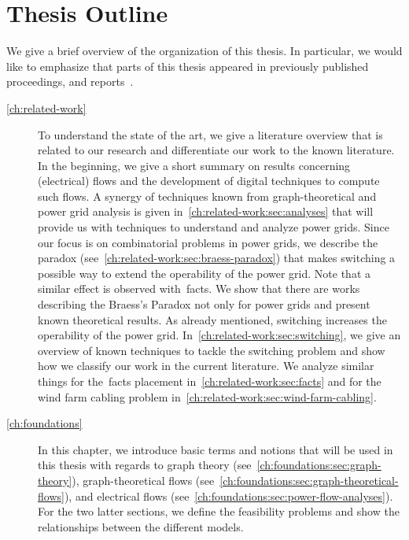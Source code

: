 \section{Thesis Outline}
\label{ch:intro:sec:outline}
% 
We give a brief overview of the organization of this thesis. In particular, we
would like to emphasize that parts of this thesis appeared in previously
published proceedings, and reports~\parencite{Lei15b,Lei15,Mch15,Leh17,Gra18}.
% 
\begin{description}
    \item[\cref{ch:related-work}] To understand the state of the art, we give a
    literature overview that is related to our research and differentiate our
    work to the known literature. In the beginning, we give a short summary on
    results concerning (electrical) flows and the development of digital
    techniques to compute such flows. A synergy of techniques known from
    graph-theoretical and power grid analysis is given
    in~\cref{ch:related-work:sec:analyses} that will provide us with techniques
    to understand and analyze power grids. Since our focus is on combinatorial
    problems in power grids, we describe the paradox
    (see~\cref{ch:related-work:sec:braess-paradox}) that makes switching a
    possible way to extend the operability of the power grid. Note that a
    similar effect is observed with~\gls{facts}. We show that there are works
    describing the Braess's Paradox not only for power grids and present known
    theoretical results. As already mentioned, switching increases the
    operability of the power grid. In~\cref{ch:related-work:sec:switching}, we
    give an overview of known techniques to tackle the switching problem and
    show how we classify our work in the current literature. We analyze similar
    things for the~\gls{facts} placement in~\cref{ch:related-work:sec:facts} and
    for the wind farm cabling problem
    in~\cref{ch:related-work:sec:wind-farm-cabling}.
    \item[\cref{ch:foundations}] In this chapter, we introduce basic terms and
    notions that will be used in this thesis with regards to graph theory
    (see~\cref{ch:foundations:sec:graph-theory}), graph-theoretical flows
    (see~\cref{ch:foundations:sec:graph-theoretical-flows}), and electrical 
    flows (see~\cref{ch:foundations:sec:power-flow-analyses}). For the two
    latter sections, we define the feasibility problems and show the
    relationships between the different models.

\end{description}
